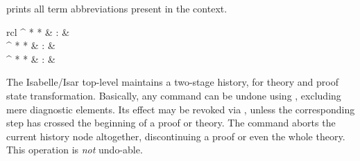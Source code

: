 \begin{isabellebody}
\begin{isamarkuptext}
\begin{descr}
  \item [\mbox{\isa{\isacommand{print{\isacharunderscore}binds}}}] prints all term abbreviations
  present in the context.

  \end{descr}%
\end{isamarkuptext}%
\isamarkuptrue%
%
\isamarkuptrue%
%
\begin{isamarkuptext}%
\begin{matharray}{rcl}
    \mbox{}^{{ * }{ * }} & : & \isarkeep{\cdot} \\
    \mbox{}^{{ * }{ * }} & : & \isarkeep{\cdot} \\
    \mbox{}^{{ * }{ * }} & : & \isarkeep{\cdot} \\
  \end{matharray}

  The Isabelle/Isar top-level maintains a two-stage history, for
  theory and proof state transformation.  Basically, any command can
  be undone using \mbox{}, excluding mere diagnostic
  elements.  Its effect may be revoked via \mbox{}, unless
  the corresponding \mbox{} step has crossed the beginning
  of a proof or theory.  The \mbox{} command aborts the
  current history node altogether, discontinuing a proof or even the
  whole theory.  This operation is \emph{not} undo-able.


\end{isamarkuptext}
\end{isabellebody}

